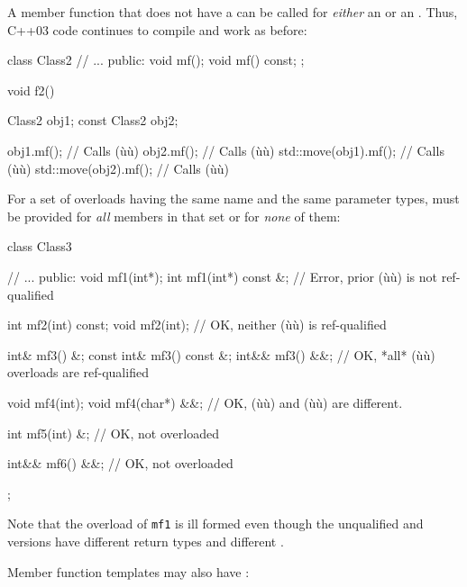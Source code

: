 \noindent A member function that does not have a  can be
called for \emph{either} an  or an . Thus,
C++03 code continues to compile and work as before:

\begin{emcppslisting}
class Class2
{
    // ...
public:
    void mf();
    void mf() const;
};

void f2()
{
    Class2       obj1;
    const Class2 obj2;

    obj1.mf();             // Calls (ù{}ù)
    obj2.mf();             // Calls (ù{}ù)
    std::move(obj1).mf();  // Calls (ù{}ù)
    std::move(obj2).mf();  // Calls (ù{}ù)
}
\end{emcppslisting}
    

\noindent For a set of overloads having the same name and the same parameter
types,  must be provided for \emph{all} members
in that set or for \emph{none} of them:

\begin{emcppslisting}
class Class3
{
    // ...
public:
    void mf1(int*);
    int  mf1(int*) const &;  // Error, prior (ù{}ù) is not ref-qualified

    int  mf2(int) const;
    void mf2(int);           // OK, neither (ù{}ù) is ref-qualified

    int&        mf3() &;
    const int&  mf3() const &;
    int&&       mf3() &&;    // OK, *all* (ù{}ù) overloads are ref-qualified

    void mf4(int);
    void mf4(char*) &&;      // OK, (ù{}ù) and (ù{}ù) are different.

    int mf5(int) &;          // OK, not overloaded

    int&& mf6() &&;          // OK, not overloaded
};
\end{emcppslisting}
    

\noindent Note that the overload of \lstinline!mf1! is ill formed even though the
unqualified and  versions have different return
types and different .

Member function templates may also have :


